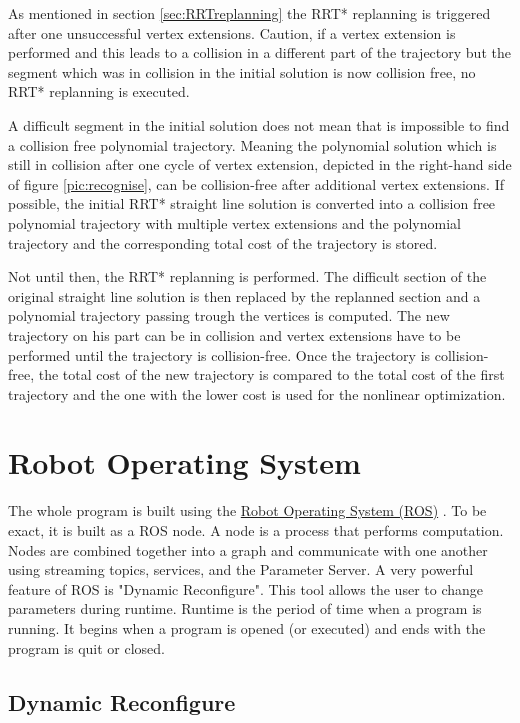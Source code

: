 As mentioned in section \ref{sec:RRTreplanning} the RRT* replanning is triggered after one unsuccessful vertex extensions. Caution, if a vertex extension is performed and this leads to a collision in a different part of the trajectory but the segment which was in collision in the initial solution is now collision free, no RRT* replanning is executed. \newline

A difficult segment in the initial solution does not mean that is impossible to find a collision free polynomial trajectory. Meaning the polynomial solution which is still in collision after one cycle of vertex extension, depicted in the right-hand side of figure \ref{pic:recognise}, can be collision-free after additional vertex extensions. If possible, the initial RRT* straight line solution is converted into a collision free polynomial trajectory with multiple vertex extensions and the polynomial trajectory and the corresponding total cost of the trajectory is stored. \newline

Not until then, the RRT* replanning is performed. The difficult section of the original straight line solution is then replaced by the replanned section and a polynomial trajectory passing trough the vertices is computed. The new trajectory on his part can be in collision and vertex extensions have to be performed until the trajectory is collision-free. Once the trajectory is collision-free, the total cost of the new trajectory is compared to the total cost of the first trajectory and the one with the lower cost is used for the nonlinear optimization.

\section{Robot Operating System}

The whole program is built using the \href{http://www.ros.org/}{Robot Operating System (ROS)} \cite{ROS}. To be exact, it is built as a ROS node. A node is a process that performs computation. Nodes are combined together into a graph and communicate with one another using streaming topics, services, and the Parameter Server. A very powerful feature of ROS is "Dynamic Reconfigure". This tool allows the user to change parameters during runtime. Runtime is the period of time when a program is running. It begins when a program is opened (or executed) and ends with the program is quit or closed.

\subsection{Dynamic Reconfigure}

